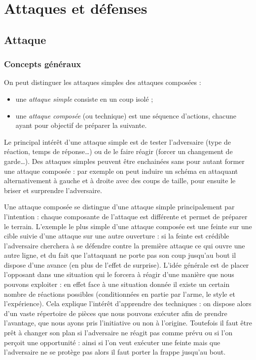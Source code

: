 \chapter{Attaques et défenses}




\section{Attaque}
\label{sec:att-def:attaque}


\subsection{Concepts généraux}
\label{sec:att-def:attaque:concepts}


\begin{definition}

\noindent
On peut distinguer les attaques simples des attaques composées :
\begin{itemize}
	\item une \emph{attaque simple} consiste en un coup isolé ;
	\item une \emph{attaque composée} (ou technique) est une séquence d'actions, chacune ayant pour objectif de préparer la suivante.
\end{itemize}
\end{definition}


Le principal intérêt d'une attaque simple est de tester l'adversaire (type de réaction, temps de réponse…) ou de le faire réagir (forcer un changement de garde…).
Des attaques simples peuvent être enchainées sans pour autant former une attaque composée : par exemple on peut induire un schéma en attaquant alternativement à gauche et à droite avec des coups de taille, pour ensuite le briser et surprendre l'adversaire.

Une attaque composée se distingue d'une attaque simple principalement par l'intention : chaque composante de l'attaque est différente et permet de préparer le terrain.
L'exemple le plus simple d'une attaque composée est une feinte sur une cible suivie d'une attaque sur une autre ouverture : si la feinte est crédible l'adversaire cherchera à se défendre contre la première attaque ce qui ouvre une autre ligne, et du fait que l'attaquant ne porte pas son coup jusqu'au bout il dispose d'une avance (en plus de l'effet de surprise).
L'idée générale est de placer l'opposant dans une situation qui le forcera à réagir d'une manière que nous pouvons exploiter : en effet face à une situation donnée il existe un certain nombre de réactions possibles (conditionnées en partie par l'arme, le style et l'expérience).
Cela explique l'intérêt d'apprendre des techniques : on dispose alors d'un vaste répertoire de pièces que nous pouvons exécuter afin de prendre l'avantage, que nous ayons pris l'initiative ou non à l'origine.
Toutefois il faut être prêt à changer son plan si l'adversaire ne réagit pas comme prévu ou si l'on perçoit une opportunité : ainsi si l'on veut exécuter une feinte mais que l'adversaire ne se protège pas alors il faut porter la frappe jusqu'au bout.

